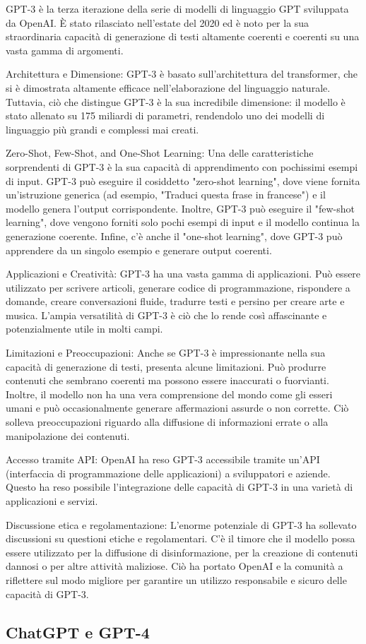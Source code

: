 GPT-3 è la terza iterazione della serie di modelli di linguaggio GPT sviluppata da OpenAI. È stato rilasciato nell'estate del 2020 ed è noto per la sua straordinaria capacità di generazione di testi altamente coerenti e coerenti su una vasta gamma di argomenti.

Architettura e Dimensione:
GPT-3 è basato sull'architettura del transformer, che si è dimostrata altamente efficace nell'elaborazione del linguaggio naturale. Tuttavia, ciò che distingue GPT-3 è la sua incredibile dimensione: il modello è stato allenato su 175 miliardi di parametri, rendendolo uno dei modelli di linguaggio più grandi e complessi mai creati.

Zero-Shot, Few-Shot, and One-Shot Learning:
Una delle caratteristiche sorprendenti di GPT-3 è la sua capacità di apprendimento con pochissimi esempi di input. GPT-3 può eseguire il cosiddetto "zero-shot learning", dove viene fornita un'istruzione generica (ad esempio, "Traduci questa frase in francese") e il modello genera l'output corrispondente. Inoltre, GPT-3 può eseguire il "few-shot learning", dove vengono forniti solo pochi esempi di input e il modello continua la generazione coerente. Infine, c'è anche il "one-shot learning", dove GPT-3 può apprendere da un singolo esempio e generare output coerenti.

Applicazioni e Creatività:
GPT-3 ha una vasta gamma di applicazioni. Può essere utilizzato per scrivere articoli, generare codice di programmazione, rispondere a domande, creare conversazioni fluide, tradurre testi e persino per creare arte e musica. L'ampia versatilità di GPT-3 è ciò che lo rende così affascinante e potenzialmente utile in molti campi.

Limitazioni e Preoccupazioni:
Anche se GPT-3 è impressionante nella sua capacità di generazione di testi, presenta alcune limitazioni. Può produrre contenuti che sembrano coerenti ma possono essere inaccurati o fuorvianti. Inoltre, il modello non ha una vera comprensione del mondo come gli esseri umani e può occasionalmente generare affermazioni assurde o non corrette. Ciò solleva preoccupazioni riguardo alla diffusione di informazioni errate o alla manipolazione dei contenuti.

Accesso tramite API:
OpenAI ha reso GPT-3 accessibile tramite un'API (interfaccia di programmazione delle applicazioni) a sviluppatori e aziende. Questo ha reso possibile l'integrazione delle capacità di GPT-3 in una varietà di applicazioni e servizi.

Discussione etica e regolamentazione:
L'enorme potenziale di GPT-3 ha sollevato discussioni su questioni etiche e regolamentari. C'è il timore che il modello possa essere utilizzato per la diffusione di disinformazione, per la creazione di contenuti dannosi o per altre attività maliziose. Ciò ha portato OpenAI e la comunità a riflettere sul modo migliore per garantire un utilizzo responsabile e sicuro delle capacità di GPT-3.

\subsection[ChatGPT e GPT4]{ChatGPT e GPT-4}

